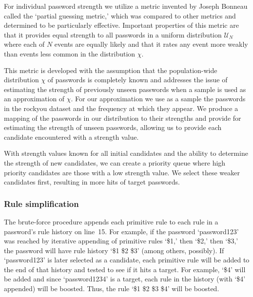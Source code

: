 \documentclass[letterpaper,twocolumn,10pt]{article}
\begin{document}
For individual password strength we utilize a metric invented by Joseph Bonneau
called the `partial guessing metric,'\cite{bonneau2012statistical} which was
compared to other metrics and determined to be particularly effective.
Important properties of this metric are that it provides equal strength to all
passwords in a uniform distribution $\mathcal{U}_{N}$ %
where each of $N$ events are equally likely and that it rates any event more
weakly than events less common in the distribution $\chi$.

This metric is developed with the assumption that the population-wide
distribution $\chi$ of passwords is completely known and addresses the issue of
estimating the strength of previously unseen passwords when a sample is used as
an approximation of $\chi$. For our approximation we use as a sample the
passwords in the rockyou dataset and the frequency at which they appear. We
produce a mapping of the passwords in our distribution to their strengths and
provide for estimating the strength of unseen passwords, allowing us to provide
each candidate encountered with a strength value.

With strength values known for all initial candidates and the ability to
determine the strength of new candidates, we can create a priority queue where
high priority candidates are those with a low strength value. We select these
weaker candidates first, resulting in more hits of target passwords.




\subsubsection{Rule simplification}

The brute-force procedure appends each primitive rule to each rule in a
password's rule history on line~15. For example, if the password `password123'
was reached by iterative appending of primitive rules `\$1,' then `\$2,' then
`\$3,' the password will have rule history `\$1 \$2 \$3' (among others,
possibly). If `password123' is later selected as a candidate, each primitive
rule will be added to the end of that history and tested to see if it hits a
target. For example, `\$4' will be added and since `password1234' is a target,
each rule in the history (with `\$4' appended) will be boosted. Thus, the rule
`\$1 \$2 \$3 \$4' will be boosted.
\end{document}
